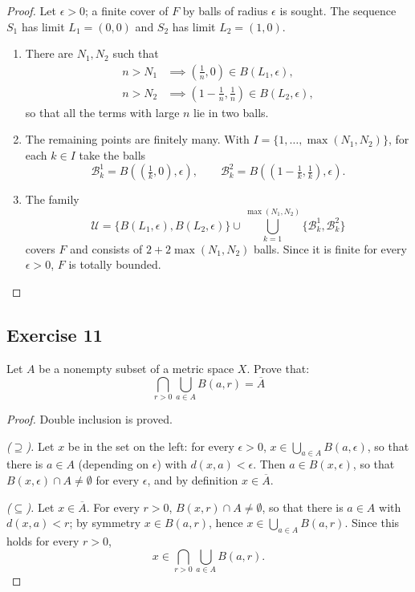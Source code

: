 \documentclass[11pt, a4paper]{article}
\begin{document}
\begin{proof}
Let $\epsilon > 0$; a finite cover of $F$ by balls of radius $\epsilon$ is sought. The sequence
$S_1$ has limit $L_1 = (0,0)$ and $S_2$ has limit $L_2 = (1,0)$.
\begin{enumerate}
    \item There are $N_1, N_2$ such that
    \begin{align*}
        n > N_1 &\implies \left(\tfrac{1}{n}, 0\right) \in B(L_1, \epsilon), \\
        n > N_2 &\implies \left(1-\tfrac{1}{n}, \tfrac{1}{n}\right) \in B(L_2, \epsilon),
    \end{align*}
    so that all the terms with large $n$ lie in two balls.
    \item The remaining points are finitely many. With $I = \{1, \dots, \max(N_1, N_2)\}$, for each
    $k \in I$ take the balls
    $$ \mathcal{B}_k^1 = B\!\left( \left(\tfrac{1}{k}, 0\right), \epsilon \right), \qquad
    \mathcal{B}_k^2 = B\!\left( \left(1-\tfrac{1}{k}, \tfrac{1}{k}\right), \epsilon \right). $$
    \item The family
    $$ \mathcal{U} = \{ B(L_1, \epsilon), B(L_2, \epsilon) \} \cup \bigcup_{k=1}^{\max(N_1, N_2)}
    \{ \mathcal{B}_k^1, \mathcal{B}_k^2 \} $$
    covers $F$ and consists of $2 + 2\max(N_1, N_2)$ balls. Since it is finite for every $\epsilon > 0$, $F$
    is totally bounded.
\end{enumerate}
\end{proof}

\subsection*{Exercise 11}

Let $A$ be a nonempty subset of a metric space $X$. Prove that:
$$ \bigcap_{r>0} \bigcup_{a \in A} B(a,r) = \overline{A} $$

\begin{proof}
Double inclusion is proved.

\textit{($\supseteq$).} Let $x$ be in the set on the left: for every $\epsilon > 0$,
$x \in \bigcup_{a \in A} B(a, \epsilon)$, so that there is $a \in A$ (depending on $\epsilon$) with
$d(x, a) < \epsilon$. Then $a \in B(x, \epsilon)$, so that
$B(x, \epsilon) \cap A \neq \emptyset$ for every $\epsilon$, and by definition $x \in \overline{A}$.

\textit{($\subseteq$).} Let $x \in \overline{A}$. For every $r > 0$, $B(x, r) \cap A \neq \emptyset$,
so that there is $a \in A$ with $d(x, a) < r$; by symmetry $x \in B(a, r)$, hence
$x \in \bigcup_{a \in A} B(a, r)$. Since this holds for every $r > 0$,
$$ x \in \bigcap_{r>0} \bigcup_{a \in A} B(a,r). $$
\end{proof}
\end{document}
